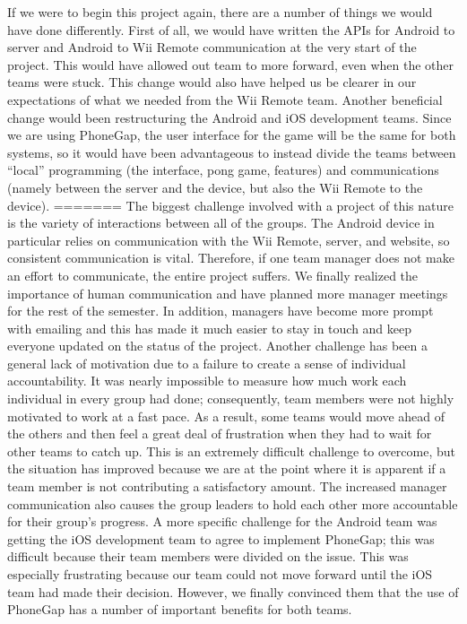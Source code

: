 \documentclass[12pt]{article}
\newenvironment{itemize*}%
  {\begin{itemize}%
  	\setlength{\parsep}{0pt}
    \setlength{\itemsep}{0pt}%
    \setlength{\parskip}{0pt}}%
  {\end{itemize}}
\begin{document}
\begin{itemize*}
If we were to begin this project again, there are a number of things we would have done differently.  First of all, we would have written the APIs for Android to server and Android to Wii Remote communication at the very start of the project.  This would have allowed out team to more forward, even when the other teams were stuck.  This change would also have helped us be clearer in our expectations of what we needed from the Wii Remote team.  Another beneficial change would been restructuring the Android and iOS development teams.  Since we are using PhoneGap, the user interface for the game will be the same for both systems, so it would have been advantageous to instead divide the teams between “local” programming (the interface, pong game, features) and communications (namely between the server and the device, but also the Wii Remote to the device). 
=======
The biggest challenge involved with a project of this nature is the variety of interactions between all of the groups.  The Android device in particular relies on communication with the Wii Remote, server, and website, so consistent communication is vital.  Therefore, if one team manager does not make an effort to communicate, the entire project suffers.  We finally realized the importance of human communication and have planned more manager meetings for the rest of the semester.  In addition, managers have become more prompt with emailing and this has made it much easier to stay in touch and keep everyone updated on the status of the project.  Another challenge has been a general lack of motivation due to a failure to create a sense of individual accountability.  It was nearly impossible to measure how much work each individual in every group had done; consequently, team members were not highly motivated to work at a fast pace.  As a result, some teams would move ahead of the others and then feel a great deal of frustration when they had to wait for other teams to catch up.  This is an extremely difficult challenge to overcome, but the situation has improved because we are at the point where it is apparent if a team member is not contributing a satisfactory amount.  The increased manager communication also causes the group leaders to hold each other more accountable for their group’s progress.  A more specific challenge for the Android team was getting the iOS development team to agree to implement PhoneGap; this was difficult because their team members were divided on the issue.  This was especially frustrating because our team could not move forward until the iOS team had made their decision.  However, we finally convinced them that the use of PhoneGap has a number of important benefits for both teams.


\end{itemize*}
\end{document}
